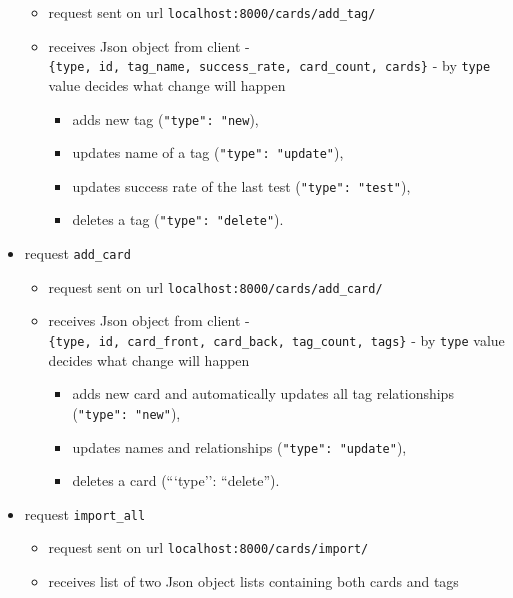 \documentclass[12pt]{article}
\providecommand{\tightlist}{\setlength{\itemsep}{1pt}\setlength{\parskip}{1pt}}
\let\oldtexttt\texttt
\renewcommand{\texttt}[1]{\oldtexttt{\textcolor{codehighlight}{#1}}}
\begin{document}
\begin{itemize}
  \begin{itemize}
  \tightlist
  \item
    request sent on url \texttt{localhost:8000/cards/add\_tag/}
  \item
    receives Json object from client -
    \texttt{\{type,\ id,\ tag\_name,\ success\_rate,\ card\_count,\ cards\}}
    - by \texttt{type} value decides what change will happen

    \begin{itemize}
    \tightlist
    \item
      adds new tag (\texttt{"type":\ "new}),
    \item
      updates name of a tag (\texttt{"type":\ "update"}),
    \item
      updates success rate of the last test (\texttt{"type":\ "test"}),
    \item
      deletes a tag (\texttt{"type":\ "delete"}).
    \end{itemize}
  \end{itemize}
\item
  request \texttt{add\_card}

  \begin{itemize}
  \tightlist
  \item
    request sent on url \texttt{localhost:8000/cards/add\_card/}
  \item
    receives Json object from client -
    \texttt{\{type,\ id,\ card\_front,\ card\_back,\ tag\_count,\ tags\}}
    - by \texttt{type} value decides what change will happen

    \begin{itemize}
    \tightlist
    \item
      adds new card and automatically updates all tag relationships
      (\texttt{"type":\ "new"}),
    \item
      updates names and relationships (\texttt{"type":\ "update"}),
    \item
      deletes a card (```type'': ``delete'').
    \end{itemize}
  \end{itemize}
\item
  request \texttt{import\_all}

  \begin{itemize}
  \item
    request sent on url \texttt{localhost:8000/cards/import/}
  \item
    receives list of two Json object lists containing both cards and
    tags


\end{itemize}
\end{itemize}
\end{document}
